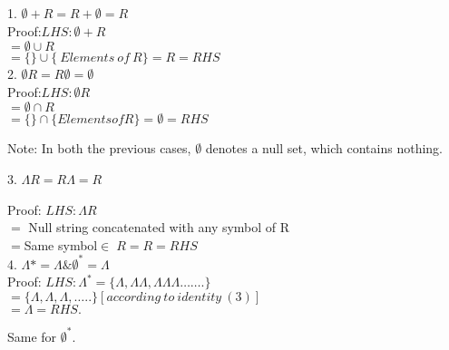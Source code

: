 
	\begin{frame}
\!\!\!\!\!\!\!\!\!\!\!\!\!\!\!\!\!\!\!\!\begin{solution}
\begin{listing} 
   1.  $\emptyset+R =R+\emptyset =R$\\\vspace{2mm}
\quad Proof:$ LHS: \emptyset +R$\\
\qquad\qquad$= \emptyset \cup R$\\
\qquad\qquad$ = \{ \} \cup \{\ Elements \ of\ R\} = R =RHS$\\\vspace{2mm}
   2.  $\emptyset R= R \emptyset =\emptyset$\\\vspace{2mm}\vspace{2mm}
\quad Proof:$ LHS: \emptyset R$\\
\qquad\qquad$= \emptyset \cap R$\\
\qquad\qquad$= \{ \} \cap \{Elements of R\} =\emptyset = RHS$\\\vspace{2mm}

       Note: In both the previous cases, $\emptyset$ denotes a null set, which contains nothing.\\
\end{listing}
      \end{solution}
	\end{frame}	
	\begin{frame}
\!\!\!\!\!\!\!\!\!\!\!\!\!\!\!\!\!\!\!\!\begin{solution}
\begin{listing} 
   3.  $\Lambda R = R\Lambda = R$\vspace{2mm}

\quad Proof: $LHS: \Lambda R$\\
\qquad\qquad$=$ Null string concatenated with any symbol of R\\
\qquad\qquad$= $Same symbol$ \in R = R = RHS$\\\vspace{2mm}
   4. $\Lambda* = \Lambda \& \emptyset^* = \Lambda$\\\vspace{2mm}
\quad Proof: $LHS: \Lambda^* = \{\Lambda, \Lambda\Lambda, \Lambda\Lambda\Lambda……. \}$\\
\qquad\qquad$=\{\Lambda, \Lambda, \Lambda, …..\} [according\ to\ identity\ (3)]$\\
\qquad\qquad$=\Lambda = RHS.$

      Same for $\emptyset^*$.
\end{listing}
	\end{solution}	
	\end{frame}	
